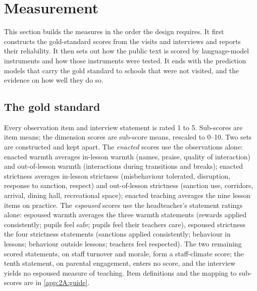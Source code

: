 



\section{Measurement}
\label{sec:p1_measurement}

This section builds the measures in the order the design requires. It first
constructs the gold-standard scores from the visits and interviews and reports
their reliability. It then sets out how the public text is scored by
language-model instruments and how those instruments were tested. It ends
with the prediction models that carry the gold standard to schools that were
not visited, and the evidence on how well they do so.

\subsection{The gold standard}

Every observation item and interview statement is rated 1 to 5. Sub-scores
are item means; the dimension scores are sub-score means, rescaled to 0--10.
Two sets are constructed and kept apart. The \emph{enacted} scores use the
observations alone: enacted warmth averages in-lesson warmth (names, praise,
quality of interaction) and out-of-lesson warmth (interactions during
transitions and breaks); enacted strictness averages in-lesson strictness
(misbehaviour tolerated, disruption, response to sanction, respect) and
out-of-lesson strictness (sanction use, corridors, arrival, dining hall,
recreational space); enacted teaching averages the nine lesson items on
practice. The \emph{espoused} scores use the headteacher's statement ratings
alone: espoused warmth averages the three warmth statements (rewards applied
consistently; pupils feel safe; pupils feel their teachers care), espoused
strictness the four strictness statements (sanctions applied consistently;
behaviour in lessons; behaviour outside lessons; teachers feel respected). The
two remaining scored statements, on staff turnover and morale, form a
staff-climate score; the tenth statement, on parental engagement, enters no
score, and the interview yields no espoused measure of teaching. Item
definitions and the mapping to sub-scores are in \cref{app:2A:guide}.

